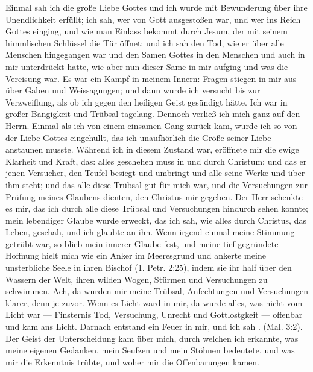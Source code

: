 Einmal sah ich die große Liebe Gottes und ich wurde mit
Bewunderung über ihre Unendlichkeit erfüllt; ich sah, wer von
Gott ausgestoßen war, und wer ins Reich 
Gottes einging, und
wie man Einlass bekommt durch Jesum, der mit seinem 
himmlischen Schlüssel die Tür öffnet; und ich sah den Tod, wie er
über alle Menschen hingegangen war und den Samen Gottes in
den Menschen und auch in mir unterdrückt hatte, wie aber nun
dieser Same in mir aufging und was die Vereisung war. Es
war ein Kampf in meinem Innern: Fragen stiegen in mir
aus über Gaben und Weissagungen; und dann wurde ich
versucht bis zur Verzweiflung, als ob ich gegen den heiligen Geist
gesündigt hätte. Ich war in großer Bangigkeit und Trübsal
tagelang. Dennoch verließ ich mich ganz auf den Herrn. 
Einmal als ich von einem einsamen Gang zurück kam, wurde ich so
von der Liebe Gottes eingehüllt, das ich unaufhörlich die Größe
seiner Liebe anstaunen musste. Während ich in diesem Zustand
war, eröffnete mir die ewige Klarheit und Kraft, das: alles %
geschehen muss in und durch Christum; und das er jenen Versucher,
den Teufel besiegt und umbringt und alle seine Werke und über
ihm steht; und das alle diese Trübsal gut für mich war, und
die Versuchungen zur Prüfung meines Glaubens dienten, den
Christus mir gegeben. Der Herr schenkte es mir, das ich durch
alle diese Trübsal und Versuchungen hindurch sehen konnte;
mein lebendiger Glaube wurde erweckt, das ich sah, wie alles
durch Christus, das Leben, geschah, und ich glaubte an ihn. Wenn
irgend einmal meine Stimmung getrübt war, so blieb mein innerer
Glaube fest, und meine tief gegründete Hoffnung hielt mich wie
ein Anker im Meeresgrund und ankerte meine unsterbliche Seele
in ihren Bischof (1. Petr. 2:25), 
indem sie ihr half über den Wassern
der Welt, ihren wilden Wogen, Stürmen und Versuchungen zu
schwimmen. Ach, da wurden mir meine Trübsal, Anfechtungen
und Versuchungen klarer, denn je zuvor. Wenn es Licht ward
in mir, da wurde alles, was nicht vom Licht war — Finsternis
Tod, Versuchung, Unrecht und Gottlostgkeit — offenbar und kam
ans Licht. Darnach entstand ein Feuer in mir, und ich sah . (Mal. 3:2). Der Geist 
der Unterscheidung kam über
mich, durch welchen ich erkannte, was meine eigenen Gedanken,
mein Seufzen und mein Stöhnen bedeutete, und was mir die
Erkenntnis trübte, und woher mir die Offenbarungen kamen.
